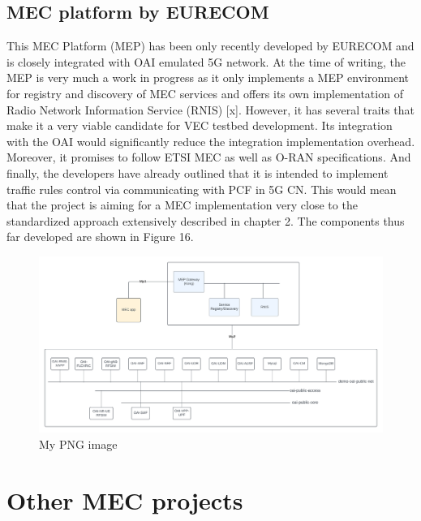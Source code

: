 \documentclass[12pt,a4paper,twoside]{report}
\begin{document}
\subsection{MEC platform by EURECOM}
This MEC Platform (MEP) has been only recently developed by EURECOM and is closely integrated with OAI emulated 5G network. At the time of writing, the MEP is very much a work in progress as it only implements a MEP environment for registry and discovery of MEC services and offers its own implementation of Radio Network Information Service (RNIS) [x]. However, it has several traits that make it a very viable candidate for VEC testbed development. Its integration with the OAI would significantly reduce the integration implementation overhead. Moreover, it promises to follow ETSI MEC as well as O-RAN specifications. And finally, the developers have already outlined that it is intended to implement traffic rules control via communicating with PCF in 5G CN. This would mean that the project is aiming for a MEC implementation very close to the standardized approach extensively described in chapter 2. The components thus far developed are shown in Figure 16.
\begin{figure}[ht]
	\centering
	\includegraphics[width=13cm]{./images/OAI-MEP.png}
	\caption{My PNG image}
\end{figure}

\section{Other MEC projects}
\end{document}
